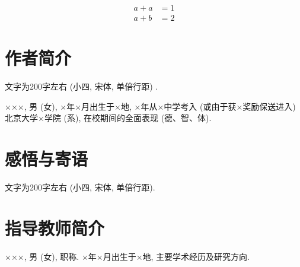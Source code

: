 \documentclass{urtemp}
\begin{document}
\begin{subequations}
    \begin{align}
        a+a&=1\label{eqA2}\\
        a+b&=2\label{eqA3}
    \end{align}
\end{subequations}
    

\section*{作者简介}

文字为200字左右 (小四, 宋体, 单倍行距) .

×××, 男 (女), ×年×月出生于×地, ×年从×中学考入 (或由于获×奖励保送进入) 北京大学×学院 (系), 在校期间的全面表现 (德、智、体).

\section*{感悟与寄语}

文字为200字左右 (小四, 宋体, 单倍行距).

\section*{指导教师简介}

×××, 男 (女), 职称. ×年×月出生于×地, 主要学术经历及研究方向.
\end{document}
